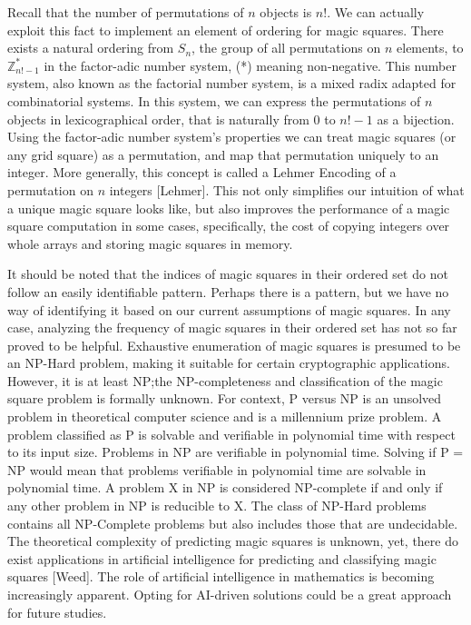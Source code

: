 \documentclass[12pt]{report}
\begin{document}
\par Recall that the number of permutations of $n$ objects is $n$!. We can actually exploit this
fact to implement an element of ordering for magic squares. There exists a natural ordering from
$S_n$, the group of all permutations on $n$ elements, to $\mathbb{Z}^{*}_{n!-1}$  in the
factor-adic number system, (*) meaning non-negative. This number system, also known as the
factorial number system, is a mixed radix adapted for combinatorial systems. In this system, we can
express the permutations of $n$ objects in lexicographical order, that is naturally from $0$ to
$n!-1$ as a bijection. Using the factor-adic number system's properties we can treat magic squares
(or any grid square) as a permutation, and map that permutation uniquely to an integer. More
generally, this concept is called a Lehmer Encoding of a permutation on $n$ integers [Lehmer]. This
not only simplifies our intuition of what a unique magic square looks like, but also improves the
performance of a magic square computation in some cases, specifically, the cost of copying integers
over whole arrays and storing magic squares in memory.

\par It should be noted that the indices of magic squares in their ordered set do not follow an
easily identifiable pattern. Perhaps there is a pattern, but we have no way of identifying it based
on our current assumptions of magic squares. In any case, analyzing the frequency of magic squares
in their ordered set has not so far proved to be helpful. Exhaustive enumeration of magic squares
is presumed to be an NP-Hard problem, making it suitable for certain cryptographic applications.
However, it is at least NP;\@ the NP-completeness and classification of the magic square problem is
formally unknown. For context, P versus NP is an unsolved problem in theoretical computer science
and is a millennium prize problem. A problem classified as P is solvable and verifiable in
polynomial time with respect to its input size. Problems in NP are verifiable in polynomial time.
Solving if P = NP would mean that problems verifiable in polynomial time are solvable in polynomial
time. A problem X in NP is considered NP-complete if and only if any other problem in NP is
reducible to X. The class of NP-Hard problems contains all NP-Complete problems but also includes
those that are undecidable. The theoretical complexity of predicting magic squares is unknown, yet,
there do exist applications in artificial intelligence for predicting and classifying magic squares
  [Weed]. The role of artificial intelligence in mathematics is becoming increasingly apparent.
Opting for AI-driven solutions could be a great approach for future studies.
\end{document}
